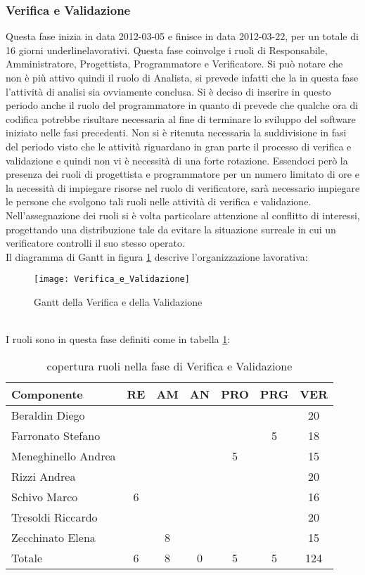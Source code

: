 \subsubsection{Verifica e Validazione}
Questa fase inizia in data 2012-03-05 e finisce in data 2012-03-22, per un totale di 16 giorni underline{lavorativi}.
Questa fase coinvolge i ruoli di Responsabile, Amministratore, Progettista, Programmatore e Verificatore. Si può notare che non è più attivo quindi il ruolo di Analista, si prevede infatti che la in questa fase l’attività di analisi sia ovviamente conclusa.
Si è deciso di inserire  in questo periodo anche il ruolo del programmatore in quanto di prevede che qualche ora di codifica potrebbe risultare necessaria al fine di terminare lo sviluppo del software iniziato nelle fasi precedenti.
Non si è ritenuta necessaria la suddivisione in fasi del periodo visto che le attività riguardano in gran parte il processo di verifica e validazione e quindi non vi è necessità di una forte rotazione.
Essendoci però la presenza dei ruoli di progettista e programmatore per un numero limitato di ore e la necessità di impiegare risorse nel ruolo di verificatore, sarà necessario impiegare le persone che svolgono tali ruoli nelle attività di verifica e validazione.  
Nell’assegnazione dei ruoli si è volta particolare attenzione al conflitto di interessi,  progettando una distribuzione tale da evitare la situazione surreale in cui un verificatore controlli il suo stesso operato.\\
Il diagramma di Gantt in figura \ref{fig:gantvv} descrive l'organizzazione lavorativa:\\
\begin{figure}[h!]
  \texttt{[image: Verifica\_e\_Validazione]}
\caption{Gantt della Verifica e della Validazione}\label{fig:gantvv}
\end{figure}\\
I ruoli sono in questa fase definiti come in tabella \ref{tab:ruolivv}:\\
\begin{table}[h!]
\centering
\begin{tabular}{|l|c|c|c|c|c|c|}
\hline
Componente& RE& AM& AN& PRO& PRG& VER\\
\hline
Beraldin Diego & & & & & & 20\\
Farronato Stefano & & & & & 5& 18\\
Meneghinello Andrea & & & & 5& & 15\\
Rizzi Andrea & & & & & & 20\\
Schivo Marco & 6& & & & & 16\\
Tresoldi Riccardo & & & & & & 20\\
Zecchinato Elena & & 8& & & & 15\\
\hline
Totale & 6& 8& 0& 5& 5& 124\\
\hline
\end{tabular}
\caption{copertura ruoli nella fase di Verifica e Validazione}\label{tab:ruolivv}
\end{table}
